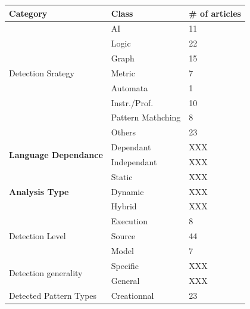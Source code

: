 \documentclass[letterpaper, 10 pt, conference]{ieeeconf}  %
\begin{document}
\begin{center}
  \small
  \begin{tabular}{ lll }
    \bf Category & \bf Class & \bf \# of articles \\
    \hline
    \multirow{7}{*}{Detection Srategy}
    & \multicolumn{1}{l}{AI}           & \multicolumn{1}{l}{11} \\
    & \multicolumn{1}{l}{Logic}        & \multicolumn{1}{l}{22} \\
    & \multicolumn{1}{l}{Graph}        & \multicolumn{1}{l}{15} \\
    & \multicolumn{1}{l}{Metric}       & \multicolumn{1}{l}{7} \\
    & \multicolumn{1}{l}{Automata}     & \multicolumn{1}{l}{1} \\
    & \multicolumn{1}{l}{Instr./Prof.} & \multicolumn{1}{l}{10} \\
    & \multicolumn{1}{l}{Pattern Mathching}
                                       & \multicolumn{1}{l}{8} \\
    & \multicolumn{1}{l}{Others}       & \multicolumn{1}{l}{23} \\
    \hline
    \multirow{2}{*}{\textbf{Language Dependance}}
    & \multicolumn{1}{l}{Dependant}    & \multicolumn{1}{l}{XXX} \\
    & \multicolumn{1}{l}{Independant}  & \multicolumn{1}{l}{XXX} \\
    \hline
    \multirow{3}{*}{\textbf{Analysis Type}}
    & \multicolumn{1}{l}{Static}       & \multicolumn{1}{l}{XXX} \\
    & \multicolumn{1}{l}{Dynamic}      & \multicolumn{1}{l}{XXX} \\
    & \multicolumn{1}{l}{Hybrid}       & \multicolumn{1}{l}{XXX} \\
    \hline
    \multirow{3}{*}{Detection Level}
    & \multicolumn{1}{l}{Execution}    & \multicolumn{1}{l}{8} \\
    & \multicolumn{1}{l}{Source}       & \multicolumn{1}{l}{44} \\
    & \multicolumn{1}{l}{Model}        & \multicolumn{1}{l}{7} \\
    \hline
    \multirow{2}{*}{Detection generality}
    & \multicolumn{1}{l}{Specific}     & \multicolumn{1}{l}{XXX} \\
    & \multicolumn{1}{l}{General}      & \multicolumn{1}{l}{XXX} \\
    \hline
    \multirow{4}{*}{Detected Pattern Types}
    & \multicolumn{1}{l}{Creationnal}  & \multicolumn{1}{l}{23} \\

\end{tabular}
\end{center}
\end{document}
